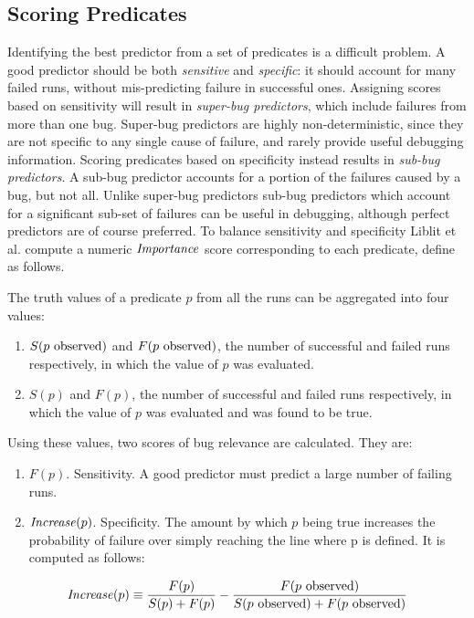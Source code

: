 \subsection{Scoring Predicates}
\label{sec-scoring}
Identifying the best predictor from a set of predicates is a difficult problem.  A good predictor should be both \emph{sensitive} and \emph{specific}: it should account for many failed runs, without mis-predicting failure in successful ones.  Assigning scores based on sensitivity will result in \emph{super-bug predictors}, which include failures from more than one bug.  Super-bug predictors are highly non-deterministic, since they are not specific to any single cause of failure, and rarely provide useful debugging information.  Scoring predicates based on specificity instead results in \emph{sub-bug predictors}.  A sub-bug predictor accounts for a portion of the failures caused by a bug, but not all.  Unlike super-bug predictors sub-bug predictors which account for a significant sub-set of failures can be useful in debugging, although perfect predictors are of course preferred.  To balance sensitivity and specificity Liblit et al. \cite{Liblit:2005:SSBI} compute a numeric $\mathit{Importance}$ score corresponding to each predicate, define as follows.

The truth values of a predicate $p$ from all the runs can be aggregated into four values:

\begin{enumerate}
\item $S(\text{$p$ observed})$ and $F(\text{$p$ observed})$, the number of successful and failed runs respectively, in which the value of $p$ was evaluated.
\item $S(p)$ and $F(p)$, the number of successful and failed runs respectively, in which the value of $p$ was evaluated and was found to be true.
\end{enumerate}

Using these values, two scores of bug relevance are calculated.  They are:
\begin{enumerate}
\item $F(p)$.  Sensitivity.  A good predictor must predict a large number of failing runs.
\item $\mathit{Increase}(p)$.  Specificity.  The amount by which $p$ being true increases the probability of failure over simply reaching the line where p is defined.  It is computed as follows:
\end{enumerate}

\begin{equation}
\label{eqn1}
\mathit{Increase}(p) \equiv
\frac{F(p)}{S(p) + F(p)}
-
\frac{F(\text{$p$ observed})}{S(\text{$p$ observed}) + F(\text{$p$ observed})}
\end{equation}

